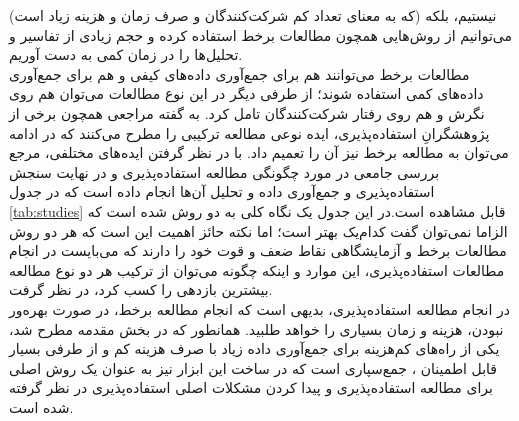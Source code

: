 (که به معنای تعداد کم شرکت‌کنندگان و صرف زمان و هزینه زیاد است) نیستیم، بلکه می‌توانیم از روش‌هایی همچون مطالعات برخط استفاده کرده و حجم زیادی از تفاسیر و تحلیل‌ها را در زمان کمی به دست آوریم.\\
مطالعات برخط می‌توانند هم برای جمع‌آوری داده‌های کیفی و هم برای جمع‌آوری داده‌های کمی استفاده شوند؛ از طرفی دیگر در این نوع مطالعات می‌توان هم روی نگرش و هم روی رفتار شرکت‌کنندگان تامل کرد. به گفته مراجعی همچون
\cite{walker_high-fidelity_2002}
برخی از پژوهشگرانِ استفاده‌پذیری، ایده نوعی مطالعه ترکیبی را مطرح می‌کنند که در ادامه می‌توان به مطالعه برخط نیز آن را تعمیم داد. با در نظر گرفتن ایده‌های مختلفی، مرجع
\cite{albert_measuring_2013}
بررسی جامعی در مورد چگونگی مطالعه استفاده‌پذیری و در نهایت سنجش استفاده‌پذیری و جمع‌آوری داده و تحلیل آن‌ها انجام داده است که در جدول
\ref{tab:studies}
قابل مشاهده است.در این جدول یک نگاه کلی به دو روش شده است که الزاما نمی‌توان گفت کدام‌یک بهتر است؛ اما نکته حائز اهمیت این است که هر دو روش مطالعات برخط و آزمایشگاهی نقاط ضعف و قوت خود را دارند که می‌بایست در انجام مطالعات استفاده‌پذیری، این موارد و اینکه چگونه می‌توان از ترکیب هر دو نوع مطالعه بیشترین بازدهی را کسب کرد، در نظر گرفت. \\
در انجام مطالعه استفاده‌پذیری، 
بدیهی است که انجام مطالعه برخط، در صورت بهره‌ور نبودن، هزینه و زمان بسیاری را خواهد طلبید. همانطور که در بخش مقدمه مطرح شد، یکی از راه‌های کم‌هزینه برای جمع‌آوری داده زیاد با صرف هزینه کم و از طرفی بسیار قابل اطمینان
\cite{li_crowdsourced_2016}
، جمع‌سپاری است که در ساخت این ابزار نیز به عنوان یک روش اصلی برای مطالعه استفاده‌پذیری و پیدا کردن مشکلات اصلی استفاده‌پذیری در نظر گرفته شده است.
